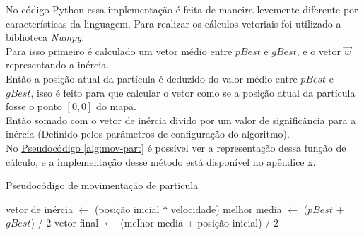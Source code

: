 No código Python essa implementação é feita de maneira levemente diferente por características da linguagem. Para realizar os cálculos vetoriais foi utilizado a biblioteca \textit{Numpy}.\\
\indent Para isso primeiro é calculado um vetor médio entre $pBest$ e $gBest$, e o vetor $\vec w$ representando a inércia.\\
\indent Então a posição atual da partícula é deduzido do valor médio entre $pBest$ e $gBest$, isso é feito para que calcular o vetor como se a posição atual da partícula fosse o ponto $[0,0]$ do mapa.\\
Então somado com o vetor de inércia divido por um valor de significância para a inércia (Definido pelos parâmetros de configuração do algoritmo).\\
%
\indent No \hyperref[alg:mov-part]{Pseudocódigo \ref{alg:mov-part}} é possível ver a representação dessa função de cálculo, e a implementação desse método está disponível no apêndice x.
\begin{algorithm}
    \caption{Pseudocódigo de movimentação de partícula}\label{alg:mov-part}
\begin{algorithmic}
\State vetor de inércia $\gets$ (posição inicial $*$ velocidade)
\State melhor media $\gets$ ($pBest$ + $gBest$) / 2
\State vetor final $\gets$ (melhor media + posição inicial) / 2
\end{algorithmic}
\end{algorithm}
